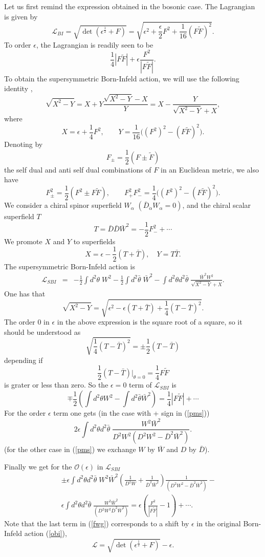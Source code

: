 \documentclass[a4paper,12pt]{article}
\begin{document}
Let us first remind the expression obtained in the bosonic case. The
Lagrangian is given by
\begin{equation}
\mathcal{L}_{BI}=\sqrt{\det(\epsilon^\frac{1}{2}+F)} =\sqrt{\epsilon^2
+\frac{\epsilon}{2}F^2 +
 \frac{1}{16}(F\tilde F)^2}.\label{obi}
\end{equation}
To order $\epsilon$, the Lagrangian is readily seen to be
$$
\frac{1}{4}|F\tilde F| +\epsilon\frac{F^2 }{|F\tilde F|}.
$$
To obtain the  supersymmetric Born-Infeld action, we will use the
following identity
\cite{cf},
$$
\sqrt{X^2-Y}=X+ Y\frac{\sqrt{X^2-Y}-X}{Y}=X-\frac{Y}{\sqrt{X^2-Y}+X},
$$
where 
$$
X=\epsilon +\frac{1}{4}F^2,\qquad Y=\frac{1}{16}\big((F^2)^2-(F\tilde
F)^2\bigr).
$$
Denoting by 
$$
F_\pm=\frac{1}{2}(F\pm\tilde F)
$$
the self dual and anti self dual combinations of $F$ in 
an Euclidean metric, we also have 
$$
F_\pm^2=\frac{1}{2}(F^2\pm F\tilde F),\qquad F_+^2F_-^2=\frac{1}{4}\bigl(
(F^2)^2-(F\tilde F)^2\bigr).
$$
We consider a chiral spinor superfield  $W_\alpha$ $(\bar
D_{\dot\alpha}W_\alpha=0)$, and 
the chiral scalar superfield $T$
$$
T=\bar D\bar D{\bar W}^2=-\frac{1}{2} F_-^2 +\cdots
$$
We promote $X$ and $Y$ to superfields 
$$
X=\epsilon-\frac{1}{2}(T+\bar T),\quad Y=T\bar T.
$$
The supersymmetric Born-Infeld action is 
\begin{eqnarray}
\mathcal{L}_{SBI}&=&-\frac{1}{2}\int d^2\theta\; W^2-\frac{1}{2}\int
d^2\bar\theta\;{\bar W}^2-
\int d^2\theta d^2\bar \theta \;\frac{{\bar W}^2W^2}{\sqrt{X^2-Y} +X}.
\end{eqnarray}
One has that
$$
\sqrt{X^2-Y}=\sqrt{\epsilon^2-\epsilon(T+\bar T) +\frac{1}{4}(T-\bar
T)^2}.
$$
The order 0 in $\epsilon$ in the above expression is the square root of a
square,
so it should be understood as
\begin{equation}
\sqrt{\frac{1}{4}(T-\bar T)^2}=\pm\frac{1}{2}(T-\bar T)
\label{pms}
\end{equation}
depending if
$$
\frac{1}{2}(T-\bar T)|_{\theta=0}=\frac{1}{4}F\tilde F
$$
is grater or less than zero.
So the $\epsilon=0$ term of $\mathcal{L}_{SBI}$ is
$$
\mp\frac{1}{2}(\int d^2\theta W^2-\int d^2\bar\theta{\bar
W}^2)=\frac{1}{4}|F\tilde F|+\cdots
$$
For the order $\epsilon$ term one gets (in the case with + sign in
(\ref{pms}))
$$
2\epsilon \int d^2\theta d^2\bar\theta\; \frac{W^2{\bar W}^2}{D^2W^2
(D^2W^2-{\bar D}^2{\bar W}^2)}.
$$
(for the other case in (\ref{pms}) we exchange $W$ by $\bar W$ and $D$
by $\bar D$).

Finally we get for the $\mathcal{O}(\epsilon)$ in $\mathcal{L}_{SBI}$
\begin{eqnarray}
&&\pm\epsilon\int d^2\theta d^2\bar \theta\; W^2{\bar W}^2(\frac{1}{D^2W}+
\frac{1}{{\bar  D}^2{\bar W}^2})\frac{1}{(D^2W^2-{\bar D}^2{\bar
W}^2)}-\nonumber\\&&
\epsilon\int d^2\theta d^2\bar\theta\; \frac{W^2{\bar W}^2}{(D^2W^2{\bar
D}^2{\bar W}^2)} 
= \epsilon(\frac{F^2}{|F\tilde F|}-1) +\cdots.
\label{fwg}
\end{eqnarray}
Note that the last term in (\ref{fwg}) corresponds to a shift by $\epsilon$ in
the original
Born-Infeld action (\ref{obi}),
$$
\mathcal{L}=\sqrt{\det(\epsilon^\frac{1}{2}+F)} -\epsilon.
$$
\end{document}
